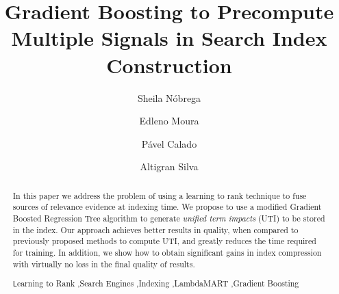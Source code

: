\documentclass[preprint,review,10pt,3p]{elsarticle}
\begin{document}
\begin{frontmatter}



\title{Gradient Boosting to Precompute Multiple Signals in Search Index Construction}

\author[mymainaddress]{Sheila N{\'obrega}}
\author[mymainaddress]{Edleno Moura}
\author[mysecondaryaddress]{P{\'a}vel Calado}
\author[mymainaddress]{Altigran Silva}

\address[mymainaddress]{Universidade Federal do Amazonas, Brasil}
\address[mysecondaryaddress]{INESC-ID, Instituto Superior T{\'e}cnico, Universidade de Lisboa}

\begin{abstract}

In this paper we address the problem of using a learning to rank technique to fuse sources of relevance evidence at indexing time. We propose to use a modified Gradient Boosted Regression Tree algorithm to generate \textit{unified term impacts} (UTI) to be stored in the index.
Our approach achieves better results in quality, when compared to previously proposed methods to compute UTI, and greatly reduces the time required for training. In addition, we show how to obtain significant gains in index compression with virtually no loss in the final quality of results.


\begin{keyword}
\texttt Learning to Rank \sep Search Engines \sep Indexing \sep LambdaMART \sep Gradient Boosting
\end{keyword}

\end{abstract}
\end{frontmatter}
\end{document}
